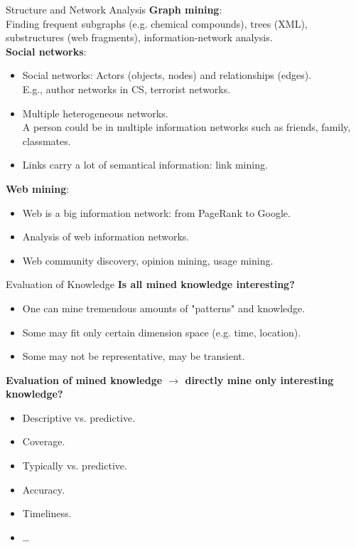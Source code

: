 \begin{frame}{Structure and Network Analysis}
	\textbf{Graph mining}:\\
	Finding frequent subgraphs (e.g. chemical compounds), trees (XML),
	substructures (web fragments), information-network analysis.\\[0.2cm]

	\textbf{Social networks}:
	\begin{itemize}
		\item Social networks: Actors (objects, nodes) and relationships
		      (edges).\\
		      E.g., author networks in CS, terrorist networks.
		\item Multiple heterogeneous networks.\\
		      A person could be in multiple information networks such as friends, family,
		      classmates.
		\item Links carry a lot of semantical information: link mining.
	\end{itemize}

	\textbf{Web mining}:
	\begin{itemize}
		\item Web is a big information network: from PageRank to Google.
		\item Analysis of web information networks.
		\item Web community discovery, opinion mining, usage mining.
	\end{itemize}
\end{frame}

\begin{frame}{Evaluation of Knowledge}
	\textbf{Is all mined knowledge interesting?}
	\begin{itemize}
		\item One can mine tremendous amounts of "patterns" and knowledge.
		\item Some may fit only certain dimension space (e.g. time, location).
		\item Some may not be representative, may be transient.
	\end{itemize}

	\textbf{Evaluation of mined knowledge $\rightarrow$ directly mine only
		interesting knowledge?}
	\begin{itemize}
		\item Descriptive vs. predictive.
		\item Coverage.
		\item Typically vs. predictive.
		\item Accuracy.
		\item Timeliness.
		\item \ldots
	\end{itemize}
\end{frame}
